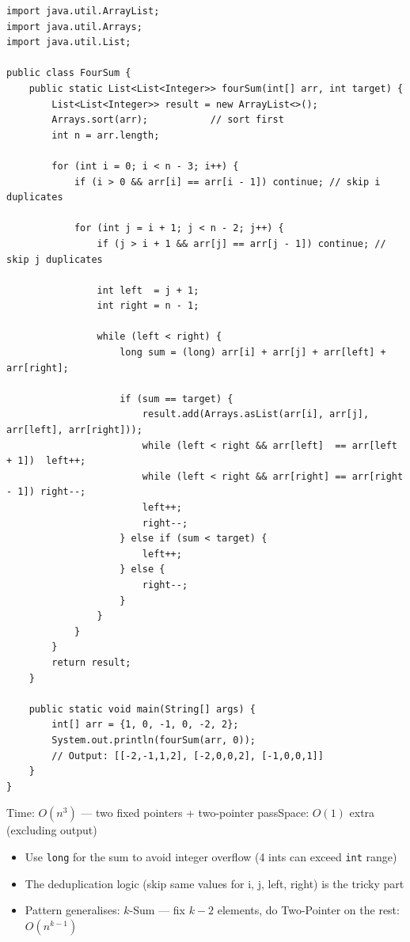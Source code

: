 \documentclass[12pt,a4paper,oneside]{book}
\begin{document}
\begin{lstlisting}[caption={4-Sum --- Fix Two + Two Pointer, O(n$^3$)}]
import java.util.ArrayList;
import java.util.Arrays;
import java.util.List;

public class FourSum {
    public static List<List<Integer>> fourSum(int[] arr, int target) {
        List<List<Integer>> result = new ArrayList<>();
        Arrays.sort(arr);           // sort first
        int n = arr.length;

        for (int i = 0; i < n - 3; i++) {
            if (i > 0 && arr[i] == arr[i - 1]) continue; // skip i duplicates

            for (int j = i + 1; j < n - 2; j++) {
                if (j > i + 1 && arr[j] == arr[j - 1]) continue; // skip j duplicates

                int left  = j + 1;
                int right = n - 1;

                while (left < right) {
                    long sum = (long) arr[i] + arr[j] + arr[left] + arr[right];

                    if (sum == target) {
                        result.add(Arrays.asList(arr[i], arr[j], arr[left], arr[right]));
                        while (left < right && arr[left]  == arr[left + 1])  left++;
                        while (left < right && arr[right] == arr[right - 1]) right--;
                        left++;
                        right--;
                    } else if (sum < target) {
                        left++;
                    } else {
                        right--;
                    }
                }
            }
        }
        return result;
    }

    public static void main(String[] args) {
        int[] arr = {1, 0, -1, 0, -2, 2};
        System.out.println(fourSum(arr, 0));
        // Output: [[-2,-1,1,2], [-2,0,0,2], [-1,0,0,1]]
    }
}
\end{lstlisting}

\begin{complexity}
Time: $O(n^3)$ --- two fixed pointers + two-pointer pass\quad Space: $O(1)$ extra (excluding output)
\end{complexity}

\begin{interviewcorner}
\begin{itemize}
  \item Use \texttt{long} for the sum to avoid integer overflow (4 ints can exceed \texttt{int} range)
  \item The deduplication logic (skip same values for i, j, left, right) is the tricky part
  \item Pattern generalises: $k$-Sum --- fix $k-2$ elements, do Two-Pointer on the rest: $O(n^{k-1})$
\end{itemize}
\end{interviewcorner}
\end{document}
